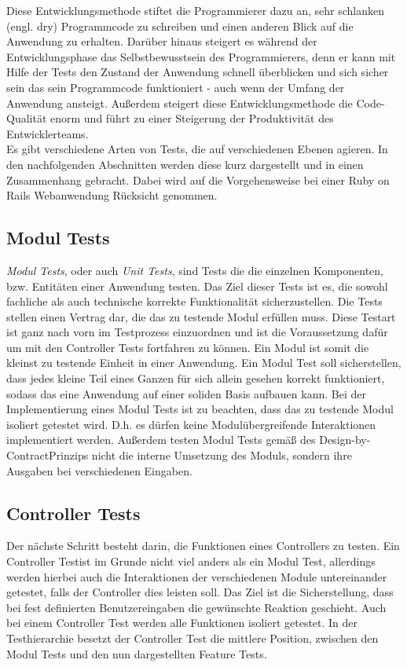\documentclass[12pt,             %
               a4paper,          %
               listof=totoc,     %
               index=totoc,      %
               bibliography=totoc,%
               oneside,         %
               BCOR1cm,          %
               english   %
               ]{scrbook}
\begin{document}
Diese Entwicklungsmethode stiftet die Programmierer dazu an, sehr schlanken (engl. \glqq dry\grqq) Programmcode zu schreiben und einen anderen Blick auf die Anwendung zu erhalten. Darüber hinaus steigert es während der Entwicklungsphase das Selbstbewusstsein des Programmierers, denn er kann mit Hilfe der Tests den Zustand der Anwendung schnell überblicken und sich sicher sein das sein Programmcode funktioniert - auch wenn der Umfang der Anwendung ansteigt. Außerdem steigert diese Entwicklungsmethode die Code-Qualität enorm und führt zu einer Steigerung der Produktivität des Entwicklerteams.\\

Es gibt verschiedene Arten von Tests, die auf verschiedenen Ebenen agieren. In den nachfolgenden Abschnitten werden diese kurz dargestellt und in einen Zusammenhang gebracht. Dabei wird auf die Vorgehensweise bei einer Ruby on Rails Webanwendung Rücksicht genommen. 

\subsection{Modul Tests}
\textit{Modul Tests}, oder auch \textit{Unit Tests}, sind Tests die die einzelnen Komponenten, bzw. Entitäten einer Anwendung testen. Das Ziel dieser Tests ist es, die sowohl fachliche als auch technische korrekte Funktionalität sicherzustellen. Die Tests stellen einen Vertrag dar, die das zu testende Modul erfüllen muss. Diese Testart ist ganz nach vorn im Testprozess einzuordnen und ist die Voraussetzung dafür um mit den Controller Tests fortfahren zu können. Ein Modul ist somit die kleinst zu testende Einheit in einer Anwendung. Ein Modul Test soll sicherstellen, dass jedes kleine Teil eines Ganzen für sich allein gesehen korrekt funktioniert, sodass das eine Anwendung auf einer soliden Basis aufbauen kann. Bei der Implementierung eines Modul Tests ist zu beachten, dass das zu testende Modul isoliert getestet wird. D.h. es dürfen keine Modulübergreifende Interaktionen implementiert werden. Außerdem testen Modul Tests gemäß des \glqq Design-by-Contract\grqq Prinzips nicht die interne Umsetzung des Moduls, sondern ihre Ausgaben bei verschiedenen Eingaben.

\subsection{Controller Tests}
Der nächste Schritt besteht darin, die Funktionen eines Controllers zu testen. Ein \glqq Controller Test\grqq ist im Grunde nicht viel anders als ein Modul Test, allerdings werden hierbei auch die Interaktionen der verschiedenen Module untereinander getestet, falls der Controller dies leisten soll. Das Ziel ist die Sicherstellung, dass bei fest definierten Benutzereingaben die gewünschte Reaktion geschieht. Auch bei einem Controller Test werden alle Funktionen isoliert getestet. In der Testhierarchie besetzt der Controller Test die mittlere Position, zwischen den Modul Tests und den nun dargestellten Feature Tests.
\end{document}
